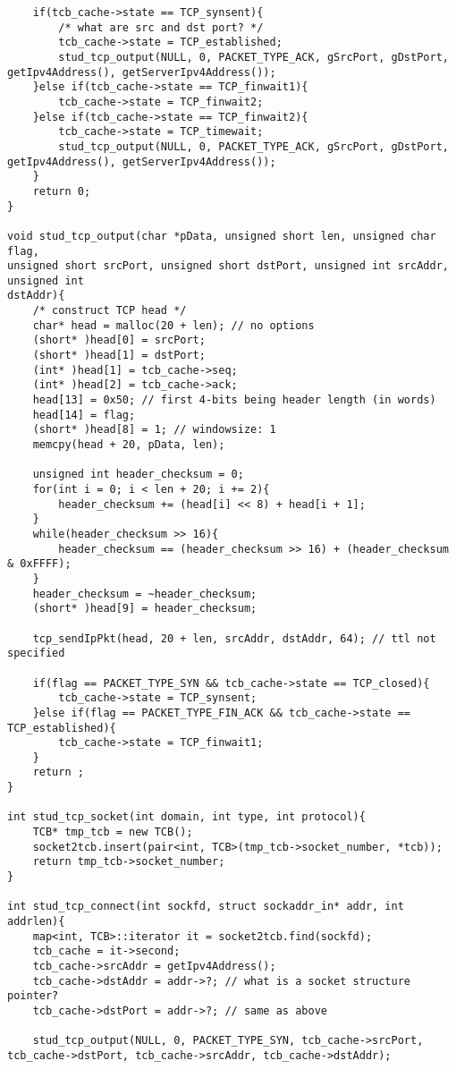 \documentclass{article}
\begin{document}
\begin{lstlisting}
    if(tcb_cache->state == TCP_synsent){
        /* what are src and dst port? */
        tcb_cache->state = TCP_established;
        stud_tcp_output(NULL, 0, PACKET_TYPE_ACK, gSrcPort, gDstPort, getIpv4Address(), getServerIpv4Address());
    }else if(tcb_cache->state == TCP_finwait1){
        tcb_cache->state = TCP_finwait2;
    }else if(tcb_cache->state == TCP_finwait2){
        tcb_cache->state = TCP_timewait;
        stud_tcp_output(NULL, 0, PACKET_TYPE_ACK, gSrcPort, gDstPort, getIpv4Address(), getServerIpv4Address());
    }
    return 0;
}

void stud_tcp_output(char *pData, unsigned short len, unsigned char flag,
unsigned short srcPort, unsigned short dstPort, unsigned int srcAddr, unsigned int
dstAddr){
    /* construct TCP head */
    char* head = malloc(20 + len); // no options
    (short* )head[0] = srcPort;
    (short* )head[1] = dstPort;
    (int* )head[1] = tcb_cache->seq;
    (int* )head[2] = tcb_cache->ack;
    head[13] = 0x50; // first 4-bits being header length (in words)
    head[14] = flag;
    (short* )head[8] = 1; // windowsize: 1
    memcpy(head + 20, pData, len);

    unsigned int header_checksum = 0;
    for(int i = 0; i < len + 20; i += 2){
        header_checksum += (head[i] << 8) + head[i + 1];
    }
    while(header_checksum >> 16){
        header_checksum == (header_checksum >> 16) + (header_checksum & 0xFFFF);
    }
    header_checksum = ~header_checksum;
    (short* )head[9] = header_checksum;

    tcp_sendIpPkt(head, 20 + len, srcAddr, dstAddr, 64); // ttl not specified

    if(flag == PACKET_TYPE_SYN && tcb_cache->state == TCP_closed){
        tcb_cache->state = TCP_synsent;
    }else if(flag == PACKET_TYPE_FIN_ACK && tcb_cache->state == TCP_established){
        tcb_cache->state = TCP_finwait1;
    }
    return ;
}

int stud_tcp_socket(int domain, int type, int protocol){
    TCB* tmp_tcb = new TCB();
    socket2tcb.insert(pair<int, TCB>(tmp_tcb->socket_number, *tcb));
    return tmp_tcb->socket_number;
}

int stud_tcp_connect(int sockfd, struct sockaddr_in* addr, int addrlen){
    map<int, TCB>::iterator it = socket2tcb.find(sockfd);
    tcb_cache = it->second;
    tcb_cache->srcAddr = getIpv4Address();
    tcb_cache->dstAddr = addr->?; // what is a socket structure pointer?
    tcb_cache->dstPort = addr->?; // same as above

    stud_tcp_output(NULL, 0, PACKET_TYPE_SYN, tcb_cache->srcPort, tcb_cache->dstPort, tcb_cache->srcAddr, tcb_cache->dstAddr);


\end{lstlisting}
\end{document}
